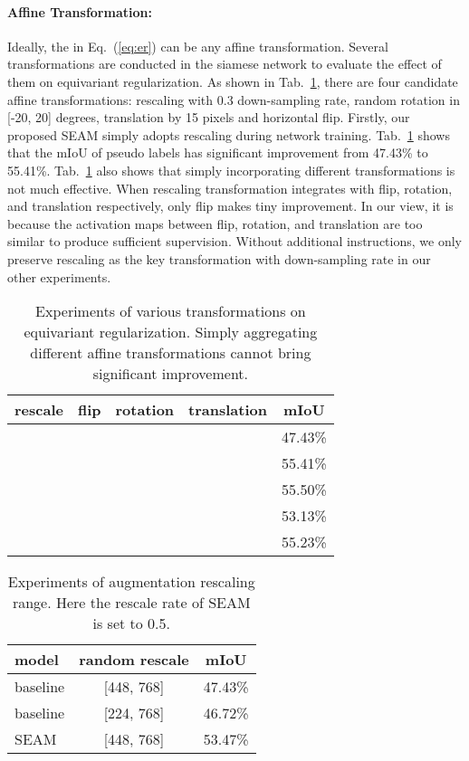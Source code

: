\documentclass[10pt,twocolumn,letterpaper]{article}
\begin{document}
\paragraph{Affine Transformation:}
	Ideally, the  in Eq.~(\ref{eq:er}) can be any affine transformation. Several transformations are conducted in the siamese network to evaluate the effect of them on equivariant regularization. As shown in Tab.~\ref{tab:transformation}, there are four candidate affine transformations: rescaling with 0.3 down-sampling rate, random rotation in [-20, 20] degrees, translation by 15 pixels and horizontal flip. Firstly, our proposed SEAM simply adopts rescaling during network training. Tab.~\ref{tab:transformation} shows that the mIoU of pseudo labels has significant improvement from 47.43\% to 55.41\%. Tab.~\ref{tab:transformation} also shows that simply incorporating different transformations is not much effective. When rescaling transformation integrates with flip, rotation, and translation respectively, only flip makes tiny improvement. In our view, it is because the activation maps between flip, rotation, and translation are too similar to produce sufficient supervision. Without additional instructions, we only preserve rescaling as the key transformation with  down-sampling rate in our other experiments.
	\begin{table}[tbp]
		\centering
		\begin{tabular}{ccccc}
			\hline
			rescale & flip & rotation & translation & mIoU\\
			\hline
			& & & & 47.43\%\\
			 & & & & 55.41\%\\
			 &  & & & 55.50\%\\
			 & &  & & 53.13\%\\
			 & & &  & 55.23\%\\
			\hline
		\end{tabular}
		\caption{Experiments of various transformations on equivariant regularization. Simply aggregating different affine transformations cannot bring significant improvement.}
		\label{tab:transformation}
\end{table}
	\begin{table}[tbp]
		\centering
		\begin{tabular}{lcc}
			\hline
			model & random rescale & mIoU\\
			\hline
			baseline & [448, 768] & 47.43\%\\
			baseline & [224, 768] & 46.72\%\\
			SEAM & [448, 768] & 53.47\%\\
			\hline
		\end{tabular}
		\caption{Experiments of augmentation rescaling range. Here the rescale rate of SEAM is set to 0.5.}
		\label{tab:range}
\end{table}
\end{document}
